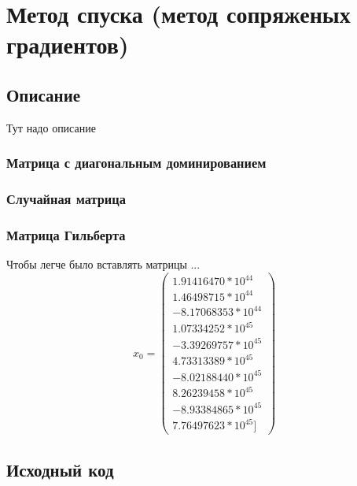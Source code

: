 \documentclass[../../report.tex]{subfiles}
\begin{document}
\chapter{Метод спуска (метод сопряженых градиентов)}

\section{Описание}
Тут надо описание

\subsection{Матрица с диагональным доминированием}

\subsection{Случайная матрица}

\subsection{Матрица Гильберта}
Чтобы легче было вставлять матрицы ...
\[
x_{0} =
\begin{pmatrix}
     1.91416470 * 10^{44} \\
     1.46498715 * 10^{44} \\
    -8.17068353 * 10^{44} \\
     1.07334252 * 10^{45} \\
    -3.39269757 * 10^{45} \\
     4.73313389 * 10^{45} \\
    -8.02188440 * 10^{45} \\
     8.26239458 * 10^{45} \\
    -8.93384865 * 10^{45} \\
     7.76497623 * 10^{45}]
\end{pmatrix}
\]

\section{Исходный код}
\end{document}
